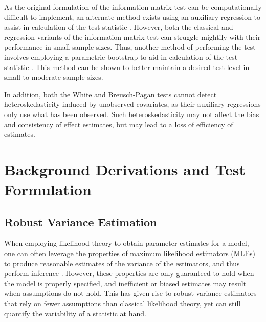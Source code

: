 \documentclass[sn-mathphys-ay]{sn-jnl}
\begin{document}
        As the original formulation of the information matrix test can be computationally difficult to implement, an alternate method exists using an
		auxiliary regression to assist in calculation of the test statistic \citep{Chesher}. However, both the classical and regression variants of the information matrix test can struggle mightily with their performance in small sample sizes. Thus, another method of performing the test involves employing a parametric bootstrap to aid in calculation of the test statistic \citep{Dhaene}. This method can be shown to better maintain a desired test level in small to moderate sample sizes. 

		In addition, both the White and Breusch-Pagan tests cannot detect heteroskedasticity induced by unobserved covariates, as their auxiliary regressions only use what has been observed. Such heteroskedasticity
		may not affect the bias and consistency of effect estimates, but may lead to a loss of efficiency of estimates. 



\section{Background Derivations and Test Formulation}

\subsection{Robust Variance Estimation}

When employing likelihood theory to obtain parameter estimates for a model, one can often leverage the properties of maximum likelihood estimators (MLEs) to produce reasonable estimates of the variance of the
estimators, and thus perform inference \citep{Millar}. However, these properties are only guaranteed to hold when the model is properly specified, and inefficient or biased estimates may result when assumptions
do not hold. This has given rise to robust variance estimators that rely on fewer assumptions than classical likelihood theory, yet can still quantify the variability of a statistic
at hand.
\end{document}
